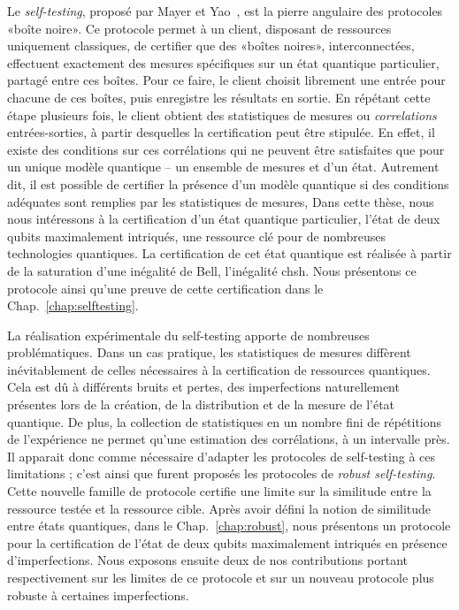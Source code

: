 Le \textit{self-testing}, proposé par Mayer et Yao~\cite{Mayers2004}, est la pierre angulaire des protocoles «boîte noire».
Ce protocole permet à un client, disposant de ressources uniquement classiques, de certifier que des «boîtes noires», interconnectées, effectuent exactement des mesures spécifiques sur un état quantique particulier, partagé entre ces boîtes. 
Pour ce faire, le client choisit librement une entrée pour chacune de ces boîtes, puis enregistre les résultats en sortie.
En répétant cette étape plusieurs fois, le client obtient des statistiques de mesures ou \textit{correlations} entrées-sorties, à partir desquelles la certification peut être stipulée.
En effet, il existe des conditions sur ces corrélations qui ne peuvent être satisfaites que pour un unique modèle quantique -- un ensemble de mesures et d'un état.
Autrement dit, il est possible de certifier la présence d'un modèle quantique si des conditions adéquates sont remplies par les statistiques de mesures,
Dans cette thèse, nous nous intéressons à la certification d'un état quantique particulier, l'état de deux qubits maximalement intriqués, une ressource clé pour de nombreuses technologies quantiques.
La certification de cet état quantique est réalisée à partir de la saturation d'une inégalité de Bell, l'inégalité \acrfull{chsh}.
Nous présentons ce protocole ainsi qu'une preuve de cette certification dans le Chap.~\ref{chap:selftesting}.

\medbreak

La réalisation expérimentale du self-testing apporte de nombreuses problématiques.
Dans un cas pratique, les statistiques de mesures diffèrent inévitablement de celles nécessaires à la certification de ressources quantiques.
Cela est dû à différents bruits et pertes, des imperfections naturellement présentes lors de la création, de la distribution et de la mesure de l'état quantique.
De plus, la collection de statistiques en un nombre fini de répétitions de l'expérience ne permet qu'une estimation des corrélations, à un intervalle près.
Il apparait donc comme nécessaire d'adapter les protocoles de self-testing à ces limitations ; c'est ainsi que furent proposés les protocoles de \textit{robust self-testing}.
Cette nouvelle famille de protocole certifie une limite sur la similitude entre la ressource testée et la ressource cible.
Après avoir défini la notion de similitude entre états quantiques, dans le Chap.~\ref{chap:robust}, nous présentons un protocole pour la certification de l'état de deux qubits maximalement intriqués en présence d'imperfections.
Nous exposons ensuite deux de nos contributions portant respectivement sur les limites de ce protocole et sur un nouveau protocole plus robuste à certaines imperfections.

